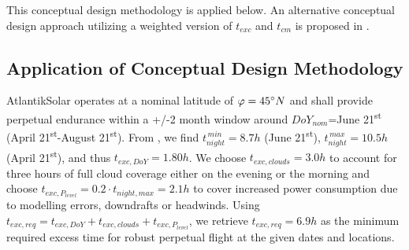This conceptual design methodology is applied below. An alternative conceptual design approach utilizing a weighted version of $t_{exc}$ and $t_{cm}$ is proposed in \cite{Morton_ICRA2013}. 

\subsection{Application of Conceptual Design Methodology} \label{sec:ConceptDesignApplication}

AtlantikSolar operates at a nominal latitude of $\varphi=45\degree N$ and shall provide perpetual endurance within a +/-2 month window around $DoY_{nom}$=June 21\textsuperscript{st} (April 21\textsuperscript{st}-August 21\textsuperscript{st}). From \cite{Duffie_SolarEngineering}, we find $t_{night}^{\,min}=8.7h$ (June 21\textsuperscript{st}), $t_{night}^{\,max}=10.5h$(April 21\textsuperscript{st}), and thus $t_{exc,DoY}=1.80h$. We choose $t_{exc,clouds}=3.0h$ to account for three hours of full cloud coverage either on the evening or the morning and choose $t_{exc,P_{level}}=0.2\cdot t_{night,max}=2.1h$ to cover increased power consumption due to modelling errors, downdrafts or headwinds. Using $t_{exc,req}=t_{exc,DoY}+t_{exc,clouds}+t_{exc,P_{level}}$, we retrieve $t_{exc,req}=6.9h$ as the minimum required excess time for robust perpetual flight at the given dates and locations. 

